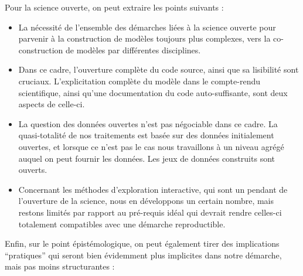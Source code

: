Pour la science ouverte, on peut extraire les points suivants :

\begin{itemize}
	\item La nécessité de l'ensemble des démarches liées à la science ouverte pour parvenir à la construction de modèles toujours plus complexes, vers la co-construction de modèles par différentes disciplines.
	\item Dans ce cadre, l'ouverture complète du code source, ainsi que sa lisibilité sont cruciaux. L'explicitation complète du modèle dans le compte-rendu scientifique, ainsi qu'une documentation du code auto-suffisante, sont deux aspects de celle-ci.
	\item La question des données ouvertes n'est pas négociable dans ce cadre. La quasi-totalité de nos traitements est basée sur des données initialement ouvertes, et lorsque ce n'est pas le cas nous travaillons à un niveau agrégé auquel on peut fournir les données. Les jeux de données construits sont ouverts.
	\item Concernant les méthodes d'exploration interactive, qui sont un pendant de l'ouverture de la science, nous en développons un certain nombre, mais restons limités par rapport au pré-requis idéal qui devrait rendre celles-ci totalement compatibles avec une démarche reproductible.
\end{itemize}

Enfin, sur le point épistémologique, on peut également tirer des implications ``pratiques'' qui seront bien évidemment plus implicites dans notre démarche, mais pas moins structurantes :

